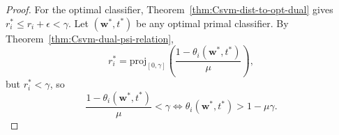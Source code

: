 \documentclass[10pt,a4paper]{amsart}
\newcommand\proj{\mathrm{proj}}
\newcommand\w{\bm{w}}
\begin{document}
\begin{proof}
For the optimal classifier, Theorem~\ref{thm:Csvm-dist-to-opt-dual} gives $r_i^* \leq r_i+\epsilon < \gamma$. Let $(\w^*,t^*)$ be any optimal primal classifier. By Theorem~\ref{thm:Csvm-dual-psi-relation},
\[
    r_i^* = \proj_{[0,\gamma]}\left(\frac{1-\theta_i(\w^*,t^*)}{\mu}\right),
\]
but $r_i^* < \gamma$, so
\[
\frac{1-\theta_i(\w^*,t^*)}{\mu} < \gamma \iff \theta_i(\w^*,t^*) > 1 - \mu\gamma.
\]
\end{proof}
\end{document}
